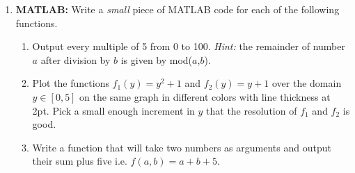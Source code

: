 \documentclass[letterpaper, fontsize=11pt]{scrartcl} %
\numberwithin{equation}{section} %
\numberwithin{figure}{section} %
\numberwithin{table}{section} %
\begin{document}
\begin{enumerate}
\item \textbf{MATLAB:} Write a \textit{small} piece of MATLAB code for each of the following functions. 
\begin{enumerate}
\item Output every multiple of 5 from 0 to 100. \textit{Hint:} the remainder of number $a$ after division by $b$ is given by mod($a$,$b$). 


\item Plot the functions $f_1(y) = y^2 + 1$ and $f_2(y) = y + 1$ over the domain $y \in [0,5]$ on the same graph in different colors with line thickness at 2pt. Pick a small enough increment in $y$ that the resolution of $f_1$ and $f_2$ is good. 

\item Write a function that will take two numbers as arguments and output their sum plus five i.e. $f(a,b) = a + b + 5$.  


\end{enumerate}

\end{enumerate}

\end{document}

